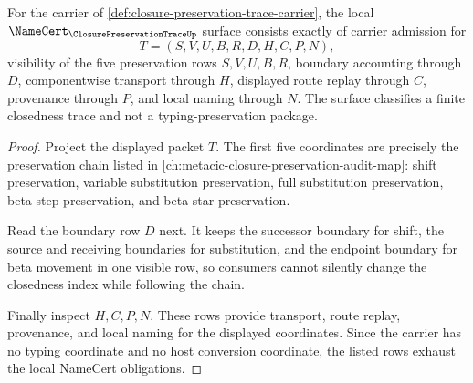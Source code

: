 \begin{theorem}
\label{thm:closure-preservation-trace-namecert-obligations}
For the carrier of \autoref{def:closure-preservation-trace-carrier}, the local $\NameCert_{\ClosurePreservationTraceUp}$ surface consists exactly of carrier admission for
$$
T=(S,V,U,B,R,D,H,C,P,N),
$$
visibility of the five preservation rows $S,V,U,B,R$, boundary accounting through $D$, componentwise transport through $H$, displayed route replay through $C$, provenance through $P$, and local naming through $N$. The surface classifies a finite closedness trace and not a typing-preservation package.
\end{theorem}
\begin{proof}
Project the displayed packet $T$. The first five coordinates are precisely the preservation chain listed in \autoref{ch:metacic-closure-preservation-audit-map}: shift preservation, variable substitution preservation, full substitution preservation, beta-step preservation, and beta-star preservation.

Read the boundary row $D$ next. It keeps the successor boundary for shift, the source and receiving boundaries for substitution, and the endpoint boundary for beta movement in one visible row, so consumers cannot silently change the closedness index while following the chain.

Finally inspect $H,C,P,N$. These rows provide transport, route replay, provenance, and local naming for the displayed coordinates. Since the carrier has no typing coordinate and no host conversion coordinate, the listed rows exhaust the local NameCert obligations.
\end{proof}

